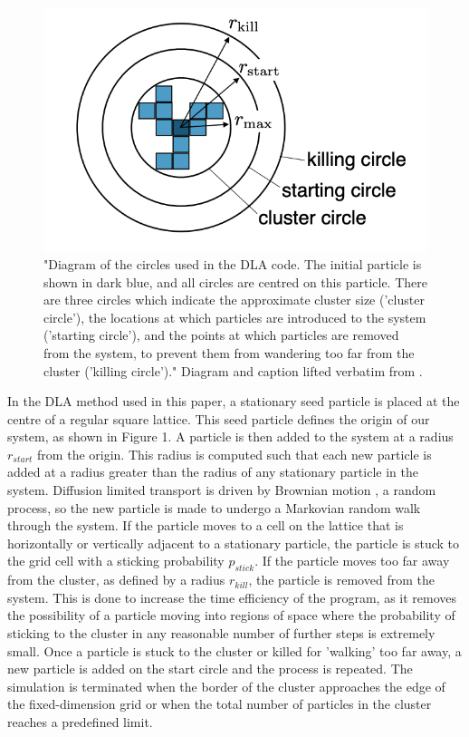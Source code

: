 \documentclass[11pt]{iopart}
\begin{document}
\begin{figure}[b]
  \centering
  \includegraphics[width=0.5\linewidth]{images/circles.png}
  \caption{"Diagram of the circles used in the DLA code. The initial particle is shown in dark blue, and all circles are centred on this particle. There are three circles which indicate the approximate cluster size ('cluster circle'), the locations at which particles are introduced to the system ('starting circle'), and the points at which particles are removed from the system, to prevent them from wandering too far from the cluster ('killing circle')." Diagram and caption lifted verbatim from \cite{handout}.}
  \label{fig:circles}
\end{figure}

In the DLA method used in this paper, a stationary seed particle is placed at the centre of a regular square lattice. This seed particle defines the origin of our system, as shown in Figure 1. A particle is then added to the system at a radius $r_{start}$ from the origin. This radius is computed such that each new particle is added at a radius greater than the radius of any stationary particle in the system. Diffusion limited transport is driven by Brownian motion \cite{brownian}, a random process, so the new particle is made to undergo a Markovian random walk through the system. If the particle moves to a cell on the lattice that is horizontally or vertically adjacent to a stationary particle, the particle is stuck to the grid cell with a sticking probability $p_{stick}$. If the particle moves too far away from the cluster, as defined by a radius $r_{kill}$, the particle is removed from the system. This is done to increase the time efficiency of the program, as it removes the possibility of a particle moving into regions of space where the probability of sticking to the cluster in any reasonable number of further steps is extremely small. Once a particle is stuck to the cluster or killed for 'walking' too far away, a new particle is added on the start circle and the process is repeated. The simulation is terminated when the border of the cluster approaches the edge of the fixed-dimension grid or when the total number of particles in the cluster reaches a predefined limit.
\end{document}
